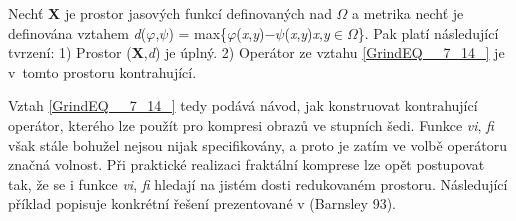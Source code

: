 \noindent Nechť \textbf{X} je prostor jasových funkcí definovaných nad $\Omega$ a metrika nechť je definována vztahem \textit{d}($\varphi$,$\psi$) = max\{\textbar $\varphi$(\textit{x},\textit{y})$-$$\psi$(\textit{x},\textit{y})\textbar  \textbar  \textit{x},\textit{y}$\in$$\Omega$\}. Pak platí následující tvrzení: 1) Prostor (\textbf{X},\textit{d}) je úplný. 2) Operátor ze vztahu \eqref{GrindEQ__7_14_} je v~tomto prostoru kontrahující.

\noindent 

\noindent Vztah \eqref{GrindEQ__7_14_} tedy podává návod, jak konstruovat kontrahující operátor, kterého lze použít pro kompresi obrazů ve stupních šedi. Funkce \textit{vi}, \textit{fi} však stále bohužel nejsou nijak specifikovány, a proto je zatím ve volbě operátoru značná volnost. Při praktické realizaci fraktální komprese lze opět postupovat tak, že se i funkce \textit{vi}, \textit{fi} hledají na jistém dosti redukovaném prostoru. Následující příklad popisuje konkrétní řešení prezentované v (Barnsley 93).

\noindent 


